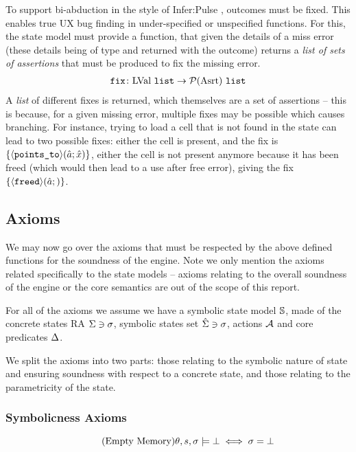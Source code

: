 To support bi-abduction in the style of Infer:Pulse \cite{pulse}, \Miss{} outcomes must be fixed. This enables true UX bug finding in under-specified or unspecified functions. For this, the state model must provide a \fix{} function, that given the details of a miss error (these details being of type \lvallist{} and returned with the outcome) returns a \emph{list of sets of assertions} that must be produced to fix the missing error. 
\begin{align*}
	\texttt{fix} \colon \text{LVal}~\texttt{list} \rightarrow {\cal P}(\text{Asrt}) ~\texttt{list}
\end{align*}
A \emph{list} of different fixes is returned, which themselves are a set of assertions -- this is because, for a given missing error, multiple fixes may be possible which causes branching. For instance, trying to load a cell that is not found in the state can lead to two possible fixes: either the cell is present, and the fix is $\{ \left<\texttt{points\_to}\right>\!(\hat{a};\hat{x}) \}$, either the cell is not present anymore because it has been freed (which would then lead to a use after free error), giving the fix $\{{\left<\texttt{freed}\right>\!(\hat{a};)}\}$.

\subsection{Axioms}

We may now go over the axioms that must be respected by the above defined functions for the soundness of the engine. Note we only mention the axioms related specifically to the state models -- axioms relating to the overall soundness of the engine or the core semantics are out of the scope of this report.

For all of the axioms we assume we have a symbolic state model $\mathbb S$, made of the concrete states RA $\Sigma \ni \sigma$, symbolic states set $\hat{\Sigma} \ni \sigma$, actions ${\cal{A}}$ and core predicates $\Delta$.

We split the axioms into two parts: those relating to the symbolic nature of state and ensuring soundness with respect to a concrete state, and those relating to the parametricity of the state.

\subsubsection{Symbolicness Axioms}

\begin{equation}
\tag{Empty Memory}\label{eq:empty-mem}
\theta,s,\sigma\models \bot \iff \sigma = \bot
\end{equation}

